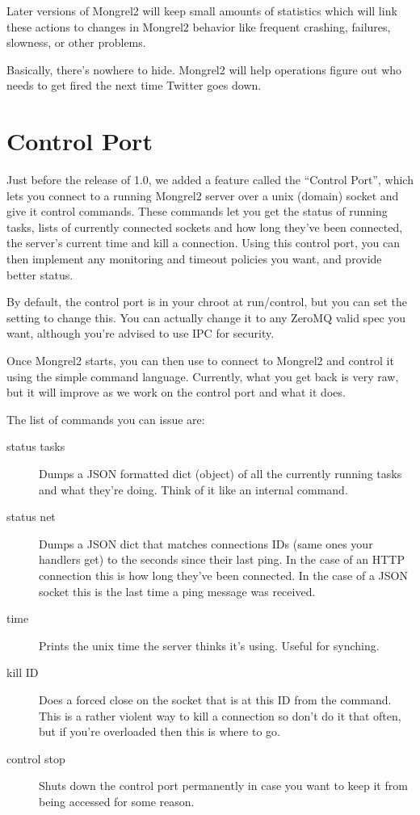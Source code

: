 Later versions of Mongrel2 will keep small amounts of statistics which will link these actions
to changes in Mongrel2 behavior like frequent crashing, failures, slowness, or other problems.

Basically, there's nowhere to hide.  Mongrel2 will help operations figure out who needs to
get fired the next time Twitter goes down.


\section{Control Port}

Just before the release of 1.0, we added a feature called the ``Control Port'', which
lets you connect to a running Mongrel2 server over a unix (domain) socket and
give it control commands.  These commands let you get the status of running
tasks, lists of currently connected sockets and how long they've been connected,
the server's current time and kill a connection.  Using this control port, you
can then implement any monitoring and timeout policies you want, and provide
better status.

By default, the control port is in your chroot at run/control, but you can set
the  setting to change this.  You can actually change it
to any ZeroMQ valid spec you want, although you're advised to use IPC for security.

Once Mongrel2 starts, you can then use  to connect to Mongrel2 and 
control it using the simple command language.  Currently, what you get back is
very raw, but it will improve as we work on the control port and what it does.

The list of commands you can issue are:

\begin{description}
\item[status tasks] Dumps a JSON formatted dict (object) of all the currently
    running tasks and what they're doing.  Think of it like an internal 
    command.
\item[status net] Dumps a JSON dict that matches connections IDs (same ones your
        handlers get) to the seconds since their last ping.  In the case of an
        HTTP connection this is how long they've been connected.  In the case
        of a JSON socket this is the last time a ping message was received.
\item[time] Prints the unix time the server thinks it's using.  Useful for synching.
\item[kill ID] Does a forced close on the socket that is at this ID from the 
    command.  This is a rather violent way to kill a connection so don't do it that
    often, but if you're overloaded then this is where to go.
\item[control stop] Shuts down the control port permanently in case you want to keep
    it from being accessed for some reason.
\end{description}

